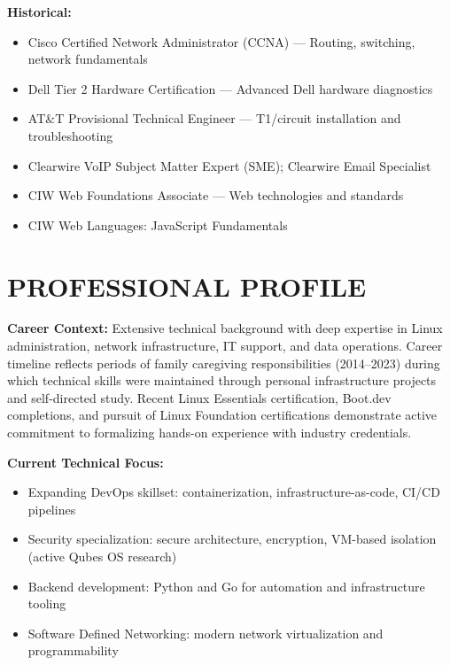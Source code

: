 \documentclass[9pt,letterpaper]{extarticle}
\begin{document}
\textbf{Historical:}
\begin{itemize}
  \item Cisco Certified Network Administrator (CCNA) --- Routing, switching, network fundamentals
  \item Dell Tier 2 Hardware Certification --- Advanced Dell hardware diagnostics
  \item AT\&T Provisional Technical Engineer --- T1/circuit installation and troubleshooting
  \nopagebreak\item Clearwire VoIP Subject Matter Expert (SME); Clearwire Email Specialist
  \nopagebreak\item CIW Web Foundations Associate --- Web technologies and standards
  \nopagebreak\item CIW Web Languages: JavaScript Fundamentals
\end{itemize}

\section*{PROFESSIONAL PROFILE}

\textbf{Career Context:} Extensive technical background with deep expertise in Linux administration, network infrastructure, IT support, and data operations. Career timeline reflects periods of family caregiving responsibilities (2014--2023) during which technical skills were maintained through personal infrastructure projects and self-directed study. Recent Linux Essentials certification, Boot.dev completions, and pursuit of Linux Foundation certifications demonstrate active commitment to formalizing hands-on experience with industry credentials.

\vspace{4pt}
\textbf{Current Technical Focus:}
\begin{itemize}
  \item Expanding DevOps skillset: containerization, infrastructure-as-code, CI/CD pipelines
  \item Security specialization: secure architecture, encryption, VM-based isolation (active Qubes OS research)
  \item Backend development: Python and Go for automation and infrastructure tooling
  \item Software Defined Networking: modern network virtualization and programmability
\end{itemize}
\end{document}
